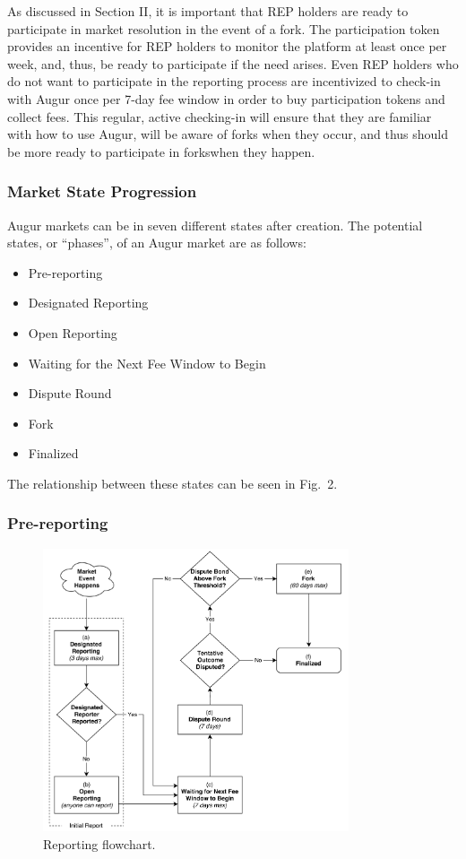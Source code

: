 \documentclass[12pt,floatfix,reprint,nofootinbib,amsmath,amssymb,epsfig,pre,floats,letterpaper,groupedaffiliation]{revtex4-1}
\theoremstyle{definition}
\theoremstyle{definition}
\begin{document}
As discussed in Section II, it is important that REP holders are ready to participate in market resolution in the event of a fork. The participation token provides an incentive for REP holders to monitor the platform at least once per week, and, thus, be ready to participate if the need arises. Even REP holders who do not want to participate in the reporting process are incentivized to check-in with Augur once per 7-day fee window in order to buy participation tokens and collect fees. This regular, active checking-in will ensure that they are familiar with how to use Augur, will be aware of forks when they occur, and thus should be more ready to participate in forks\linebreak when they happen.

\subsubsection{Market State Progression}

Augur markets can be in seven different states after creation. The potential states, or ``phases'', of an Augur market are as follows:

\begin{itemize}
\item Pre-reporting
\item Designated Reporting
\item Open Reporting
\item Waiting for the Next Fee Window to Begin
\item Dispute Round
\item Fork
\item Finalized
\end{itemize}

The relationship between these states can be seen in Fig.~2.

\subsubsection{Pre-reporting}

\begin{figure}
    \includegraphics[width=0.805\textwidth]{2.pdf}
    \caption{Reporting flowchart.}
    \label{fig:reporting}
\end{figure}
\end{document}

